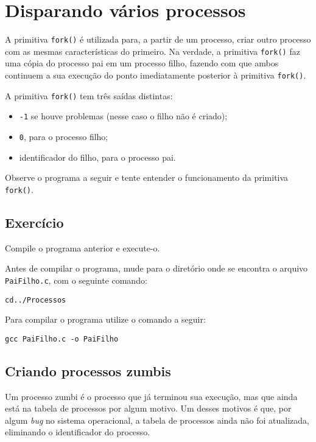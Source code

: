 \chapter{Disparando vários processos}
A primitiva \texttt{fork()} é utilizada para, a partir de um processo, criar outro processo com as mesmas características do primeiro. Na verdade, a primitiva \texttt{fork()} faz uma cópia do processo pai em um processo filho, fazendo com que ambos continuem a sua execução do ponto imediatamente posterior à  primitiva \texttt{fork()}.

A primitiva \texttt{fork()} tem três saídas distintas:
\begin{itemize}
\setlength{\itemsep}{1pt}\setlength{\parskip}{0pt}  \setlength{\parsep}{0pt}
\item \texttt{-1} se houve problemas (nesse caso o filho não é criado);
\item \texttt{0}, para o processo filho;
\item identificador do filho, para o processo pai.
\end{itemize}

Observe o programa a seguir e tente entender o funcionamento da primitiva \texttt{fork()}.



\section{Exercício}
Compile o programa anterior e execute-o.

Antes de compilar o programa, mude para o diretório onde se encontra o arquivo  \texttt{PaiFilho.c}, com o seguinte comando:

\begin{lstlisting}[style=MyBashStyle]
cd../Processos
\end{lstlisting}

Para compilar o programa utilize o comando a seguir:
\begin{lstlisting}[style=MyBashStyle]
gcc PaiFilho.c -o PaiFilho
\end{lstlisting}


\section{Criando processos zumbis}
Um processo zumbi é o processo que já terminou sua execução, mas que ainda está na tabela de processos por algum motivo. Um desses motivos é que, por algum \textit{bug} no sistema operacional, a tabela de processos ainda não foi atualizada, eliminando o identificador do processo.

